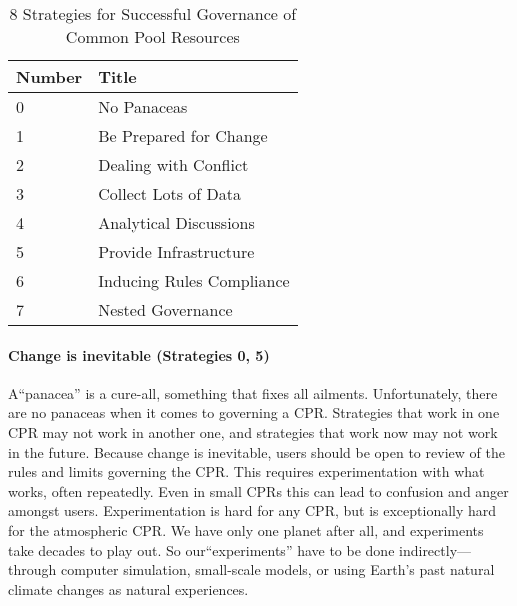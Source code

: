 \documentclass[amstex,12pt]{book}
\begin{document}
\begin{table} 
\caption{8 Strategies for Successful Governance of Common Pool Resources}
\label{tab:8 strats}
\centering
\begin{tabular}{@{}ll@{}} \toprule
Number & Title\\ \midrule 
 0 & No Panaceas\\
 1 & Be Prepared for Change\\
 2 & Dealing with Conflict\\
 3 & Collect Lots of Data\\
 4 & Analytical Discussions\\
 5 & Provide Infrastructure\\
 6 & Inducing Rules Compliance\\
 7 & Nested Governance\\ \bottomrule
\end{tabular}
\end{table}

\paragraph{Change is inevitable (Strategies 0, 5)}
A``panacea'' is a cure-all, something that fixes all ailments. Unfortunately, there are no panaceas when it comes to governing a CPR. Strategies that work in one CPR may not work in another one, and strategies that work now may not work in the future. Because change is inevitable, users should be open to review of the rules and limits governing the CPR. This requires experimentation with what works, often repeatedly. Even in small CPRs this can lead to confusion and anger amongst users. Experimentation is hard for any CPR, but is exceptionally hard for the atmospheric CPR. We have only one planet after all, and experiments take decades to play out. So our``experiments'' have to be done indirectly---through computer simulation, small-scale models, or using Earth's past natural climate changes as natural experiences.\\

\end{document}

